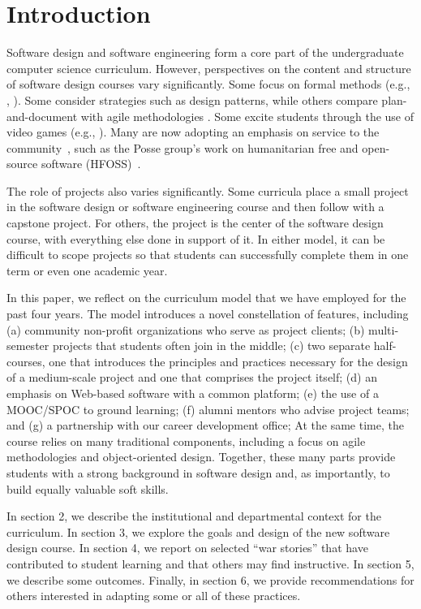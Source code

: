 
\section{Introduction}

Software design and software engineering form a core part of
the undergraduate computer science curriculum. However, perspectives
on the content and structure of software design courses vary
significantly.  Some focus on formal methods (e.g., \cite{liu-2005},
\cite{garcia-2014}).  Some consider strategies such as design
patterns, while others compare plan-and-document with agile
methodologies \cite{gestwicki-2018}.  Some excite students through
the use of video games (e.g., \cite{wolz-2007,sweedyk-2005,sweedyk-2011}).  
Many are
now adopting an emphasis on service to the community~\cite{hfoss-2018,buckley-2004,liu-2005,leidig-2006,lange-2011},
such as the Posse group's work on humanitarian free and open-source
software (HFOSS)~\cite{posse-2018}.

The role of projects also varies significantly.  Some curricula
place a small project in the software design or software engineering
course and then follow with a capstone project.  For others, the
project is the center of the software design course, with everything
else done in support of it. In either model, it can be difficult
to scope projects so that students can successfully complete them
in one term or even one academic year.

In this paper, we reflect on the curriculum model that we have
employed for the past four years.  The model introduces a novel 
constellation of features, 
including (a) community non-profit organizations who
serve as project clients; (b) multi-semester projects that students
often join in the middle; (c) two separate half-courses, one that
introduces the principles and practices necessary for the design
of a medium-scale project and one that comprises the project itself;
(d) an emphasis on
Web-based software with a common platform; (e) the use of a
MOOC/SPOC to ground learning;  
(f) alumni mentors who advise project teams; and (g) a
partnership with our career development office; 
At the same time, the course relies
on many traditional components, including a focus on agile methodologies
and object-oriented design.  Together, these many parts provide
students with a strong background in software design and, as
importantly, to build equally valuable soft skills.

In section 2, we describe the institutional and
departmental context for the curriculum.  In section 3, we explore
the goals and design of the new software design course.  In
section 4, we report on selected ``war stories'' that have contributed
to student learning and that others may find instructive.
In section 5, we describe some outcomes.  Finally,
in section 6, we provide recommendations for others interested in
adapting some or all of these practices.

